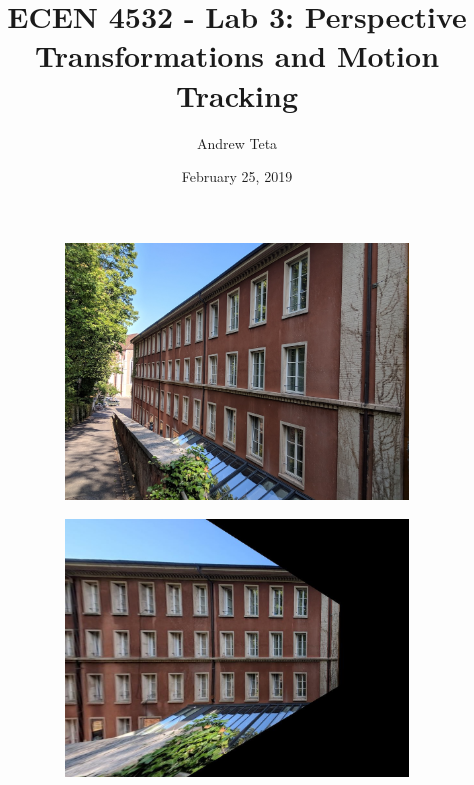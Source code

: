 \documentclass[11pt,a4paper]{article}
\author{Andrew Teta}
\title{ECEN 4532 - Lab 3: Perspective Transformations and Motion Tracking}
\date{February 25, 2019}
\begin{document}
\maketitle

\begin{figure}[ht]
	\centering
	\begin{subfigure}[h]{0.6\textwidth}
		\includegraphics[width=\textwidth]{PC_test_2}
	\end{subfigure}
	\par\bigskip
	\begin{subfigure}[h]{0.6\textwidth}
		\includegraphics[width=\textwidth]{out1}
	\end{subfigure}
\end{figure}
\end{document}
